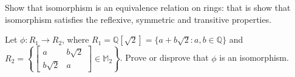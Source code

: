 \begin{exercise}
Show that isomorphism is an equivalence relation on rings: that is show that isomorphism satisfies the reflexive, symmetric and transitive properties.
\end{exercise}

\begin{exercise}\label{exercise:rings:matrixIso}
Let $\phi: R_1\rightarrow R_2$, where $R_1={\mathbb Q}[\sqrt{2}]=\{a+b\sqrt{2}:  a,b\in{\mathbb Q}\}$ and $R_2=\left\{
\begin{bmatrix}
a & b \sqrt{2}\\
b \sqrt{2} & a
\end{bmatrix}
\in{\mathbb M}_2\right\}$.  Prove or disprove that $\phi$ is an isomorphism.
\end{exercise}

